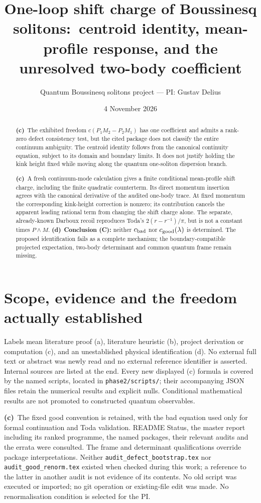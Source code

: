 \documentclass[11pt,a4paper]{article}
\title{One-loop shift charge of Boussinesq solitons:\
centroid identity, mean-profile response, and the unresolved two-body coefficient}
\author{Quantum Boussinesq solitons project --- PI: Gustav Delius}
\date{4 November 2026}
\newcommand{\C}{\textbf{(c)}\ }
\newcommand{\D}{\textbf{(d)}\ }
\newcommand{\file}[1]{\nolinkurl{#1}}
\begin{document}
\maketitle
\begin{abstract}
\C The exhibited freedom $c(P_1M_2-P_2M_1)$ has one coefficient and admits
a rank-zero defect consistency test, but the cited package does not classify
the entire continuum ambiguity. The centroid identity follows from the
canonical continuity equation, subject to its domain and boundary limits.
It does not justify holding the kink height fixed while moving along the
quantum one-soliton dispersion branch.

\C A fresh continuum-mode calculation gives a finite conditional mean-profile
shift charge, including the finite quadratic counterterm. Its direct momentum
insertion agrees with the canonical derivative of the audited one-body trace.
At fixed momentum the corresponding kink-height correction is nonzero;
its contribution cancels the apparent leading rational term from changing
the shift charge alone. The separate, already-known Darboux recoil reproduces
Toda's $2(r-r^{-1})/\pi$, but is not a constant times $P\wedge M$.
\D \textbf{Conclusion (C):} neither $c_{\rm bad}$ nor
$c_{\rm good}(\lambda)$ is determined. The proposed identification fails as
a complete mechanism; the boundary-compatible projected expectation,
two-body determinant and common quantum frame remain missing.
\end{abstract}

\section{Scope, evidence and the freedom actually established}
Labels mean literature proof (a), literature heuristic (b), project derivation
or computation (c), and an unestablished physical identification (d).
No external full text or abstract was newly read and no external reference
identifier is asserted. Internal sources are listed at the end. Every new
displayed (c) formula is covered by the named scripts, located in
\file{phase2/scripts/}; their accompanying JSON files retain the numerical
results and explicit nulls. Conditional mathematical results are not promoted
to constructed quantum observables.

\C The fixed good convention is retained, with the bad equation used only
for formal continuation and Toda validation. README Status, the master
report including its ranked programme, the named packages, their relevant
audits and the errata were consulted. The frame and determinant qualifications
override package interpretations. Neither \file{audit_defect_bootstrap.tex}
nor \file{audit_good_renorm.tex} existed when checked during this work;
a reference to the latter in another audit is not evidence of its contents.
No old script was executed or imported; no git operation or existing-file edit
was made. No renormalisation condition is selected for the PI.
\end{document}
